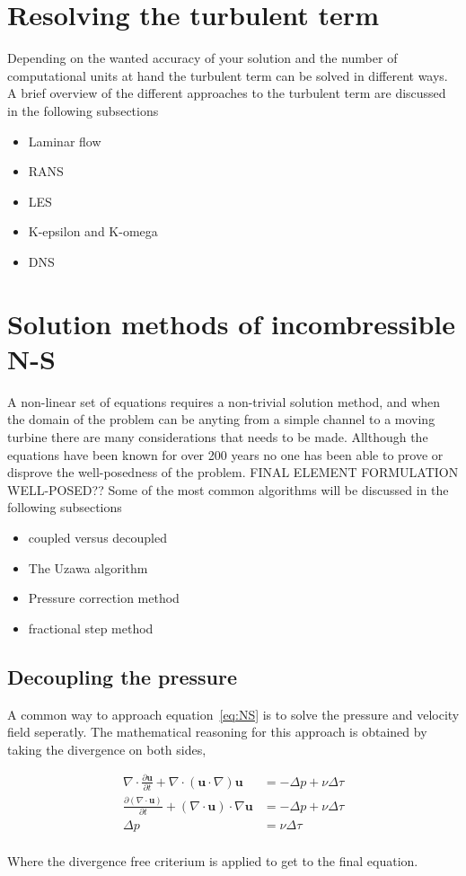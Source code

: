 \section{Resolving the turbulent term}
Depending on the wanted accuracy of your solution and the number of computational units at hand the turbulent term can be solved in 
different ways. A brief overview of the different approaches to the turbulent term are discussed in the following subsections

\begin{itemize}
	\item Laminar flow
	\item RANS
	\item LES
	\item K-epsilon and K-omega
	\item DNS
\end{itemize}

\section{Solution methods of incombressible N-S}
A non-linear set of equations requires a non-trivial solution method, and when the domain of the problem can be anyting from a simple channel 
to a moving turbine there are many considerations that needs to be made. Allthough the equations have been known for over 200 years no one 
has been able to prove or disprove the well-posedness of the problem. FINAL ELEMENT FORMULATION WELL-POSED?? Some of the most common algorithms 
will be discussed in the following subsections

\begin{itemize}
\item coupled versus decoupled 
\item The Uzawa algorithm 
\item Pressure correction method
\item fractional step method
\end{itemize}

\subsection{Decoupling the pressure} 

A common way to approach equation~\ref{eq:NS} is to solve the pressure and velocity field
seperatly. The mathematical reasoning for this approach is obtained by taking the 
divergence on both sides, 

\begin{align}
	\nabla \cdot \frac{\partial \mathbf{u}}{\partial t} + 
    \nabla \cdot(\mathbf{u} \cdot \nabla) \mathbf{u} 
    &= -\Delta p + \nu \Delta \tau \\
	\frac{\partial (\nabla \cdot  \mathbf{u})}{\partial t} + 
    (\nabla \cdot \mathbf{u}) \cdot \nabla \mathbf{u} 
    &= -\Delta p + \nu \Delta \tau \\
   \Delta p &= \nu \Delta \tau \\
	\label{eq:pressuredecoupling}
\end{align}

Where the divergence free criterium is applied to get to the final equation.
